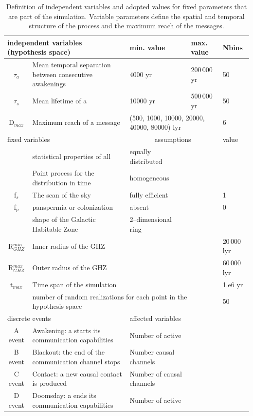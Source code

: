 \setlength{\tabcolsep}{10pt}
\begin{table}
\centering
\begin{tabular}{cllll}
\hline
   \multicolumn{2}{l}{independent variables (hypothesis space)}
   &min. value&max. value&Nbins\\
\hline
   $\tau_{a}$ & Mean temporal separation between consecutive
   awakenings & 4000 yr & 200\,000 yr & 50\\ 
   $\tau_{s}$ & Mean lifetime of a \ceti{}
   & 10000 yr & 500\,000 yr& 50\\ 
   D$_{max}$ & Maximum reach of a message  &  \multicolumn{2}{l}{(500,
   1000, 10000, 20000, 40000, 80000) lyr} & 6  \\
\hline
   \multicolumn{2}{l}{fixed variables} & \multicolumn{2}{c}{assumptions} &value \\
\hline
   & statistical properties of all \cetis{} &equally distributed&&\\
   & Point process for the distribution in time & homogeneous &&\\
   f$_s$ & The scan of the sky & fully efficient&&1\\
   f$_p$ & panspermia or colonization &absent&&0\\
   & shape of the Galactic Habitable Zone & 2--dimensional ring &&\\
   R$_{GHZ}^{min}$   & Inner radius of the GHZ     & & &20\,000 lyr\\
   R$_{GHZ}^{max}$   & Outer radius of the GHZ     &&&60\,000 lyr\\
   t$_{max}$ & Time span of the simulation  &&&1.e6 yr\\
    & \multicolumn{3}{l}{number of random realizations for each point in the hypothesis space} &50\\
\hline
   \multicolumn{2}{l}{discrete events} &
   \multicolumn{3}{l}{affected variables}\\
\hline
   A event & Awakening: a \ceti{} starts its communication
   capabilities &Number of active \cetis{}\\
   B event & Blackout: the end of the communication channel stops
   &Number causal channels\\
   C event & Contact: a new causal contact is produced &Number of causal channels\\
   D event & Doomsday: a \ceti{} ends its communication capabilities&Number of active \cetis{}\\
\hline

\hline
\end{tabular}
\caption{Definition of independent variables and adopted values for 
   fixed parameters 
   that are part of the simulation.  Variable parameters define the
   spatial and temporal structure
   of the process and the maximum reach of the messages.}
\label{T_simu_hypotheses}
\end{table}
 
